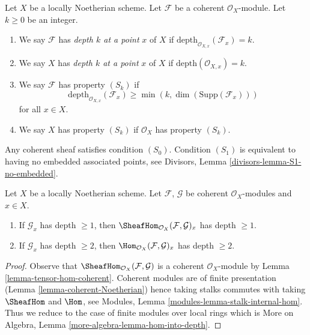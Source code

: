 \begin{definition}
\label{definition-depth}
Let $X$ be a locally Noetherian scheme.
Let $\mathcal{F}$ be a coherent $\mathcal{O}_X$-module.
Let $k \geq 0$ be an integer.
\begin{enumerate}
\item We say $\mathcal{F}$ has {\it depth $k$ at a point}
$x$ of $X$ if $\text{depth}_{\mathcal{O}_{X, x}}(\mathcal{F}_x) = k$.
\item We say $X$ has {\it depth $k$ at a point} $x$ of $X$ if
$\text{depth}(\mathcal{O}_{X, x}) = k$.
\item We say $\mathcal{F}$ has property {\it $(S_k)$} if
$$
\text{depth}_{\mathcal{O}_{X, x}}(\mathcal{F}_x)
\geq \min(k, \dim(\text{Supp}(\mathcal{F}_x)))
$$
for all $x \in X$.
\item We say $X$ has property {\it $(S_k)$} if $\mathcal{O}_X$ has
property $(S_k)$.
\end{enumerate}
\end{definition}

\noindent
Any coherent sheaf satisfies condition $(S_0)$.
Condition $(S_1)$ is equivalent to having no embedded associated
points, see Divisors, Lemma \ref{divisors-lemma-S1-no-embedded}.

\begin{lemma}
\label{lemma-hom-into-depth}
Let $X$ be a locally Noetherian scheme. Let $\mathcal{F}$, $\mathcal{G}$
be coherent $\mathcal{O}_X$-modules and $x \in X$.
\begin{enumerate}
\item If $\mathcal{G}_x$ has depth $\geq 1$, then
$\SheafHom_{\mathcal{O}_X}(\mathcal{F}, \mathcal{G})_x$
has depth $\geq 1$.
\item If $\mathcal{G}_x$ has depth $\geq 2$, then
$\Hom_{\mathcal{O}_X}(\mathcal{F}, \mathcal{G})_x$ has depth $\geq 2$.
\end{enumerate}
\end{lemma}

\begin{proof}
Observe that $\SheafHom_{\mathcal{O}_X}(\mathcal{F}, \mathcal{G})$ is
a coherent $\mathcal{O}_X$-module by Lemma \ref{lemma-tensor-hom-coherent}.
Coherent modules are of finite presentation
(Lemma \ref{lemma-coherent-Noetherian}) hence taking stalks commutes
with taking $\SheafHom$ and $\Hom$, see
Modules, Lemma \ref{modules-lemma-stalk-internal-hom}.
Thus we reduce to the case of finite modules over local
rings which is More on Algebra, Lemma \ref{more-algebra-lemma-hom-into-depth}.
\end{proof}

